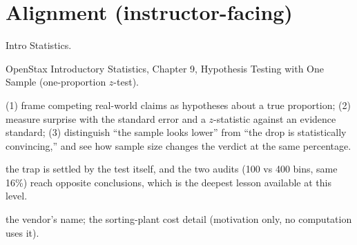 \documentclass[11pt]{article}
\begin{document}
\section*{Alignment (instructor-facing)}
\begin{description}[leftmargin=0pt, itemsep=2pt]
\item[Course:] Intro Statistics.
\item[Textbook:] OpenStax Introductory Statistics, Chapter 9, Hypothesis Testing with One Sample (one-proportion $z$-test).
\item[Learning objectives (3):] (1) frame competing real-world claims as hypotheses about a true proportion; (2) measure surprise with the standard error and a $z$-statistic against an evidence standard; (3) distinguish ``the sample looks lower'' from ``the drop is statistically convincing,'' and see how sample size changes the verdict at the same percentage.
\item[Distinct because:] the trap is settled by the test itself, and the two audits (100 vs 400 bins, same 16\%) reach opposite conclusions, which is the deepest lesson available at this level.
\item[Inert distractors:] the vendor's name; the sorting-plant cost detail (motivation only, no computation uses it).
\end{description}
\end{document}
